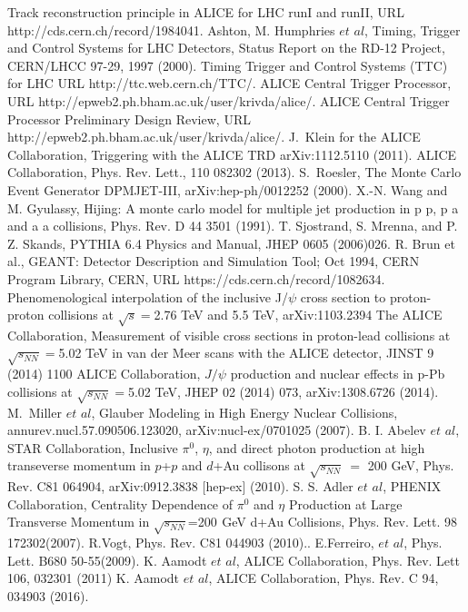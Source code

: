 \begin{thebibliography}{4}
 Track reconstruction principle in ALICE for LHC runI and runII, URL http://cds.cern.ch/record/1984041.
 Ashton, M. Humphries $et$ $al$, Timing, Trigger and Control Systems for LHC Detectors, Status Report on the RD-12 Project, CERN/LHCC 97-29, 1997 (2000).
 Timing Trigger and Control Systems (TTC) for LHC URL http://ttc.web.cern.ch/TTC/.
 ALICE Central Trigger Processor, URL http://epweb2.ph.bham.ac.uk/user/krivda/alice/. 
 ALICE Central Trigger Processor Preliminary Design Review, URL http://epweb2.ph.bham.ac.uk/user/krivda/alice/.
 J.~Klein for the ALICE Collaboration, Triggering with the ALICE TRD arXiv:1112.5110 (2011).
 ALICE Collaboration, Phys. Rev. Lett., 110 082302 (2013).
 S.~Roesler, The Monte Carlo Event Generator DPMJET-III, arXiv:hep-ph/0012252 (2000).
 X.-N. Wang and M. Gyulassy, Hijing: A monte carlo model for multiple jet production in p p, p a and a a collisions, Phys. Rev. D 44 3501 (1991).
T. Sjostrand, S. Mrenna, and P. Z. Skands, PYTHIA 6.4 Physics and Manual, JHEP 0605 (2006)026.
 R. Brun et al., GEANT: Detector Description and Simulation Tool; Oct 1994, CERN Program Library, CERN, URL https://cds.cern.ch/record/1082634.
 Phenomenological interpolation of the inclusive J/$\psi$ cross section to proton-proton collisions at $\sqrt{s}=$2.76 TeV and 5.5 TeV, arXiv:1103.2394 
 The ALICE Collaboration, Measurement of visible cross sections in proton-lead collisions at $\sqrt{s_{NN}}=$5.02 TeV in van der Meer scans with the ALICE detector, JINST 9 (2014) 1100
 ALICE Collaboration, $J/\psi$ production and nuclear effects in p-Pb collisions at $\sqrt{s_{NN}}=$5.02 TeV, JHEP 02 (2014) 073, arXiv:1308.6726 (2014).
 M.~Miller $et$ $al$, Glauber Modeling in High Energy Nuclear Collisions, annurev.nucl.57.090506.123020, arXiv:nucl-ex/0701025 (2007). 
B. I. Abelev $et$ $al$, STAR Collaboration, Inclusive $\pi^{0}$, $\eta$, and direct photon production at high transeverse momentum in $p$+$p$ and $d$+Au collisons at $\sqrt{s_{NN}}~=$ 200 GeV, Phys. Rev. C81 064904,  arXiv:0912.3838 [hep-ex] (2010).
 S. S. Adler $et$ $al$, PHENIX Collaboration, Centrality Dependence of $\pi^{0}$ and $\eta$ Production at Large Transverse Momentum in $\sqrt{s_{NN}}$=200  GeV d+Au Collisions, Phys. Rev. Lett. 98 172302(2007).
 R.Vogt, Phys. Rev. C81 044903 (2010)..
 E.Ferreiro, $et$ $al$, Phys. Lett. B680 50-55(2009).
 K. Aamodt $et$ $al$, ALICE Collaboration, Phys. Rev. Lett 106, 032301 (2011)
 K. Aamodt $et$ $al$, ALICE Collaboration, Phys. Rev. C 94, 034903 (2016).
\end{thebibliography}
